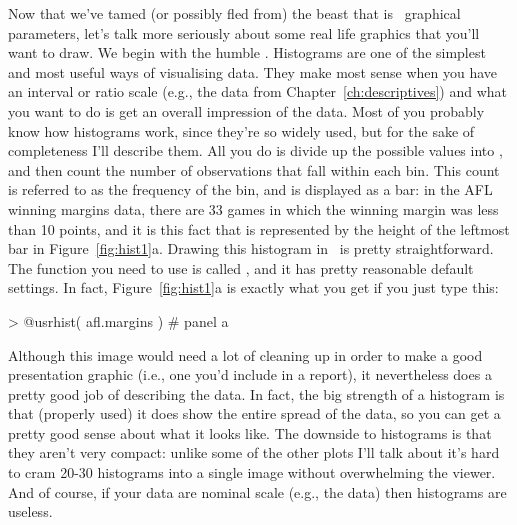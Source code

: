 Now that we've tamed (or possibly fled from) the beast that is \R\ graphical parameters, let's talk more seriously about some real life graphics that you'll want to draw. We begin with the humble . Histograms are one of the simplest and most useful ways of visualising data. They make most sense when you have an interval or ratio scale (e.g., the  data from Chapter~\ref{ch:descriptives}) and what you want to do is get an overall impression of the data. Most of you probably know how histograms work, since they're so widely used, but for the sake of completeness I'll describe them. All you do is divide up the possible values into , and then count the number of observations that fall within each bin. This count is referred to as the frequency of the bin, and is displayed as a bar: in the AFL winning margins data, there are 33 games in which the winning margin was less than 10 points, and it is this fact that is represented by the height of the leftmost bar in Figure~\ref{fig:hist1}a. Drawing this histogram in \R\ is pretty straightforward. The function you need to use is called , and it has pretty reasonable default settings. In fact, Figure~\ref{fig:hist1}a is exactly what you get if you just type this:
\begin{rblock1}
> @usr{hist( afl.margins )}   # panel a
\end{rblock1}
Although this image would need a lot of cleaning up in order to make a good presentation graphic (i.e., one you'd include in a report), it nevertheless does a pretty good job of describing the data. In fact, the big strength of a histogram is that (properly used) it does show the entire spread of the data, so you can get a pretty good sense about what it looks like. The downside to histograms is that they aren't very compact: unlike some of the other plots I'll talk about it's hard to cram 20-30 histograms into a single image without overwhelming the viewer. And of course, if your data are nominal scale (e.g., the  data) then histograms are useless.

